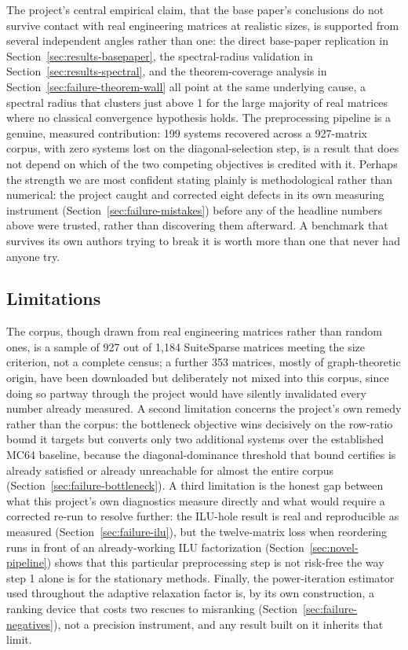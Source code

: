 \documentclass[11pt,a4paper]{article}
\begin{document}
The project's central empirical claim, that the base paper's conclusions do not survive
contact with real engineering matrices at realistic sizes, is supported from several
independent angles rather than one: the direct base-paper replication in
Section~\ref{sec:results-basepaper}, the spectral-radius validation in
Section~\ref{sec:results-spectral}, and the theorem-coverage analysis in
Section~\ref{sec:failure-theorem-wall} all point at the same underlying cause, a spectral
radius that clusters just above 1 for the large majority of real matrices where no
classical convergence hypothesis holds. The preprocessing pipeline is a genuine, measured
contribution: 199 systems recovered across a 927-matrix corpus, with zero systems lost on
the diagonal-selection step, is a result that does not depend on which of the two
competing objectives is credited with it. Perhaps the strength we are most confident
stating plainly is methodological rather than numerical: the project caught and corrected
eight defects in its own measuring instrument (Section~\ref{sec:failure-mistakes}) before
any of the headline numbers above were trusted, rather than discovering them afterward. A
benchmark that survives its own authors trying to break it is worth more than one that
never had anyone try.

\subsection{Limitations}
\label{sec:discussion-limitations}

The corpus, though drawn from real engineering matrices rather than random ones, is a
sample of 927 out of 1{,}184 SuiteSparse matrices meeting the size criterion, not a
complete census; a further 353 matrices, mostly of graph-theoretic origin, have been
downloaded but deliberately not mixed into this corpus, since doing so partway through the
project would have silently invalidated every number already measured. A second limitation
concerns the project's own remedy rather than the corpus: the bottleneck objective wins
decisively on the row-ratio bound it targets but converts only two additional systems over
the established MC64 baseline, because the diagonal-dominance threshold that bound
certifies is already satisfied or already unreachable for almost the entire corpus
(Section~\ref{sec:failure-bottleneck}). A third limitation is the honest gap between what
this project's own diagnostics measure directly and what would require a corrected
re-run to resolve further: the ILU-hole result is real and reproducible as measured
(Section~\ref{sec:failure-ilu}), but the twelve-matrix loss when reordering runs in front
of an already-working ILU factorization (Section~\ref{sec:novel-pipeline}) shows that this
particular preprocessing step is not risk-free the way step 1 alone is for the stationary
methods. Finally, the power-iteration estimator used throughout the adaptive relaxation
factor is, by its own construction, a ranking device that costs two rescues to
misranking (Section~\ref{sec:failure-negatives}), not a precision instrument, and any
result built on it inherits that limit.
\end{document}
